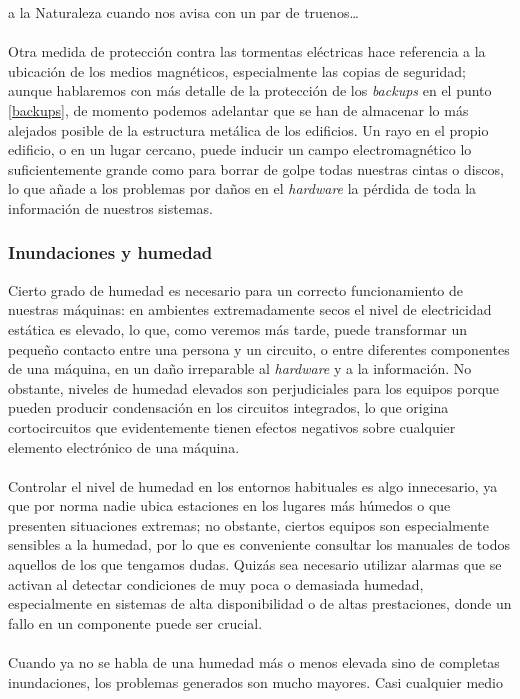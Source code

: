 a la Naturaleza cuando nos avisa con un par de truenos\ldots\\
\\Otra medida de protecci\'on contra las tormentas el\'ectricas hace referencia
a la ubicaci\'on de los medios magn\'eticos, especialmente las copias de 
seguridad; aunque hablaremos con m\'as detalle de la protecci\'on de los {\it
backups} en el punto \ref{backups}, de momento podemos adelantar que se han
de almacenar lo m\'as alejados posible de la estructura met\'alica de los 
edificios. Un rayo en el propio edificio, o en un lugar cercano, puede inducir
un campo electromagn\'etico lo suficientemente grande como para borrar de golpe
todas nuestras cintas o discos, lo que a\~nade a los problemas por da\~nos en
el {\it hardware} la p\'erdida de toda la informaci\'on de nuestros sistemas.
\subsubsection{Inundaciones y humedad}
Cierto grado de humedad es necesario para un correcto funcionamiento de nuestras
m\'aquinas: en ambientes extremadamente secos el nivel de electricidad 
est\'atica es elevado, lo que, como veremos m\'as tarde, puede transformar un
peque\~no contacto entre una persona y un circuito, o entre diferentes 
componentes de una m\'aquina, en un da\~no irreparable al {\it hardware} y a
la informaci\'on. No obstante, niveles de humedad elevados son perjudiciales
para los equipos porque pueden producir condensaci\'on en los circuitos 
integrados, lo que origina cortocircuitos que evidentemente tienen efectos 
negativos sobre cualquier elemento electr\'onico de una m\'aquina.\\
\\Controlar el nivel de humedad en los entornos habituales es algo
innecesario, ya que por norma nadie ubica estaciones en los lugares m\'as
h\'umedos o que presenten situaciones extremas; no obstante, ciertos equipos
son especialmente sensibles a la humedad, por lo que es conveniente consultar
los manuales de todos aquellos de los que tengamos dudas. Quiz\'as sea 
necesario utilizar alarmas que se activan al detectar condiciones de muy poca
o demasiada humedad, especialmente en sistemas de alta disponibilidad o de 
altas prestaciones, donde un fallo en un componente puede ser crucial.\\
\\Cuando ya no se habla de una humedad m\'as o menos elevada sino de completas
inundaciones, los problemas generados son mucho mayores. Casi cualquier medio
